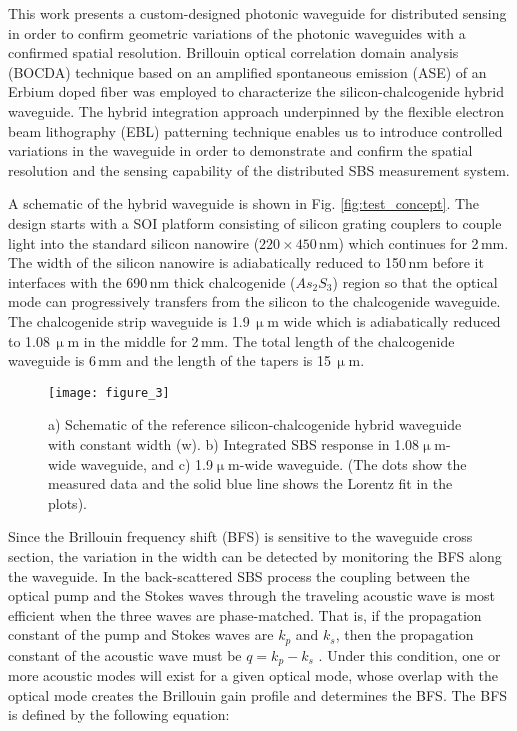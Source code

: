 \documentclass[superscriptaddress, nofootinbib, twocolumn, amsmath,amssymb, aps, pra, notitlepage, longbibliography]{revtex4-1}
\begin{document}
This work presents a custom-designed photonic waveguide for distributed sensing in order to confirm geometric variations of the photonic waveguides with a confirmed spatial resolution. Brillouin optical correlation domain analysis (BOCDA) technique based on an amplified spontaneous emission (ASE) of an Erbium doped fiber \cite{Zarifi2017,Cohen2014a} was employed to characterize the silicon-chalcogenide hybrid waveguide. The hybrid integration approach underpinned by the flexible electron beam lithography (EBL) patterning technique enables us to introduce controlled variations in the waveguide in order to demonstrate and confirm the spatial resolution and the sensing capability of the distributed SBS measurement system. 





A schematic of the hybrid waveguide is shown in Fig. \ref{fig:test_concept}. The design starts with a SOI platform consisting of silicon grating couplers to couple light into the standard silicon nanowire ($220\times450$\,nm) which continues for 2\,mm. The width of the silicon nanowire is adiabatically reduced to 150\,nm before it interfaces with the 690\,nm thick chalcogenide ($As_{2}S_{3}$) region so that the optical mode can progressively transfers from the silicon to the chalcogenide waveguide. The chalcogenide strip waveguide is 1.9\,$\upmu$m wide which is adiabatically reduced to 1.08\,$\upmu$m in the middle for 2\,mm. The total length of the chalcogenide waveguide is 6\,mm and the length of the tapers is 15\,$\upmu$m.

\begin{figure}[t!]
\centering
\texttt{[image: figure\_3]}
\caption{a) Schematic of the reference silicon-chalcogenide hybrid waveguide with constant width (w). b) Integrated SBS response in 1.08$\upmu$m-wide waveguide, and c) 1.9$\upmu$m-wide waveguide. (The dots show the measured data and the solid blue line shows the Lorentz fit in the plots).}
\label{fig:figure_3}
\end{figure}

Since the Brillouin frequency shift (BFS) is sensitive to the waveguide cross section, the variation in the width can be detected by monitoring the BFS along the waveguide.
In the back-scattered SBS process the coupling between the optical pump and the Stokes waves through the traveling acoustic wave is most efficient when the three waves are phase-matched. That is, if the propagation constant of the pump and Stokes waves are $k_{p}$ and $k_{s}$, then the propagation constant of the acoustic wave must be $q = k_{p}-k_{s}$ \cite{Eggleton2013}. Under this condition, one or more acoustic modes will exist for a given optical mode, whose overlap with the optical mode creates the Brillouin gain profile and determines the BFS. The BFS is defined by the following equation:
\end{document}
